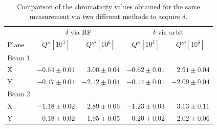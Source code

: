 \begin{table}[!htb]
    \centering
    \begin{tabular}{lrrrr}
        \toprule
              & \multicolumn{2}{c}{$\delta$ via RF}  &  \multicolumn{2}{c}{$\delta$ via orbit} \\
        Plane & \multicolumn{1}{c}{$Q'' [10^3]$}     & \multicolumn{1}{c}{$Q''' [10^6]$} & \multicolumn{1}{c}{$Q'' [10^3]$} & \multicolumn{1}{c}{$Q''' [10^6]$}\\
        \midrule
        Beam 1 &&&& \\
        \hspace{2mm}X & $-0.64 \pm 0.01$ & $ 3.00 \pm 0.04$   & $-0.62 \pm 0.01$ & $ 2.91 \pm 0.04$ \\
        \hspace{2mm}Y & $-0.17 \pm 0.01$ & $-2.12 \pm 0.04$   & $-0.14 \pm 0.01$ & $-2.09 \pm 0.04$ \\
        Beam 2 &&&& \\
        \hspace{2mm}X & $-1.18 \pm 0.02$ & $ 2.89 \pm 0.06$   & $-1.23 \pm 0.03$ & $ 3.13 \pm 0.11$ \\
        \hspace{2mm}Y & $ 0.18 \pm 0.02$ & $-1.95 \pm 0.05$   & $ 0.20 \pm 0.02$ & $-2.02 \pm 0.06$ \\
        \bottomrule
    \end{tabular}
    \caption{Comparison of the chromaticity values obtained for the same measurement via two
    different methods to acquire $\delta$.}
    \label{table:very_high_orders:bare_chroma_2016}
  \end{table}


